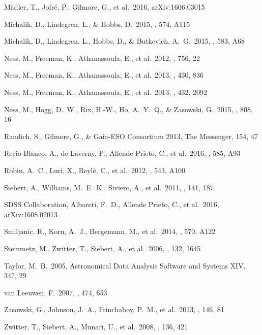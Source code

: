 \documentclass[preprint,trackchanges]{aastex}
\begin{document}
\begin{thebibliography}{dummy}
 M{\"a}dler, T., Jofr{\'e}, P., Gilmore, G., et al.\ 2016, arXiv:1606.03015 

 Michalik, D., Lindegren, L., \& Hobbs, D.\ 2015, \aap, 574, A115 

 Michalik, D., Lindegren, L., Hobbs, D., \& Butkevich, A.~G.\ 2015, \aap, 583, A68 

 Ness, M., Freeman, K., Athanassoula, E., et al.\ 2012, \apj, 756, 22 

 Ness, M., Freeman, K., Athanassoula, E., et al.\ 2013, \mnras, 430, 836 

 Ness, M., Freeman, K., Athanassoula, E., et al.\ 2013, \mnras, 432, 2092 


 Ness, M., Hogg, D.~W., Rix, H.-W., Ho, A.~Y.~Q., \& Zasowski, G.\ 2015, \apj, 808, 16 

 Randich, S., Gilmore, G., \& Gaia-ESO Consortium 2013, The Messenger, 154, 47 

 Recio-Blanco, A., de Laverny, P., Allende Prieto, C., et al.\ 2016, \aap, 585, A93 

 Robin, A.~C., Luri, X., Reyl{\'e}, C., et al.\ 2012, \aap, 543, A100 

 Siebert, A., Williams, M.~E.~K., Siviero, A., et al.\ 2011, \aj, 141, 187 

 SDSS Collaboration, Albareti, F.~D., Allende Prieto, C., et al.\ 2016, arXiv:1608.02013 

 Smiljanic, R., Korn, A.~J., Bergemann, M., et al.\ 2014, \aap, 570, A122 

 Steinmetz, M., Zwitter, T., Siebert, A., et al.\ 2006, \aj, 132, 1645 

 Taylor, M.~B.\ 2005, Astronomical Data Analysis Software and Systems XIV, 347, 29 

 van Leeuwen, F.\ 2007, \aap, 474, 653 

 Zasowski, G., Johnson, J.~A., Frinchaboy, P.~M., et al.\ 2013, \aj, 146, 81 

 Zwitter, T., Siebert, A., Munari, U., et al.\ 2008, \aj, 136, 421 

\end{thebibliography}
\end{document}
